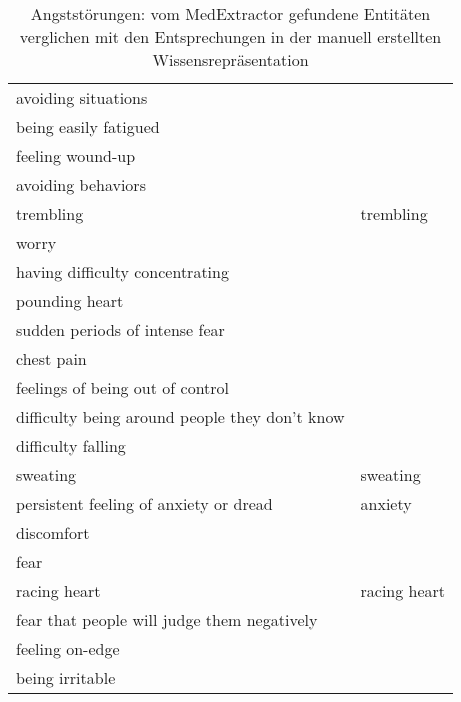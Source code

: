 \begin{table}[H]
\begin{center}
\begin{tabular}{ll}
                           avoiding situations &                       \\
                         being easily fatigued &                       \\
                              feeling wound-up &                       \\
                            avoiding behaviors &                       \\
                                     trembling &             trembling \\
                                         worry &                       \\
               having difficulty concentrating &                       \\
                                pounding heart &                       \\
                sudden periods of intense fear &                       \\
                                    chest pain &                       \\
              feelings of being out of control &                       \\
difficulty being around people they don’t know &                       \\
                            difficulty falling &                       \\
                                      sweating &              sweating \\
        persistent feeling of anxiety or dread &               anxiety \\
                                    discomfort &                       \\
                                          fear &                       \\
                                  racing heart &          racing heart \\
   fear that people will judge them negatively &                       \\
                               feeling on-edge &                       \\
                               being irritable &                       \\
\bottomrule
\end{tabular}
\caption{Angststörungen: vom MedExtractor gefundene Entitäten verglichen mit den Entsprechungen in der manuell erstellten Wissensrepräsentation}
\label{tab:anxietydisorders_medextractor_manuell}
\end{center}
\end{table}


